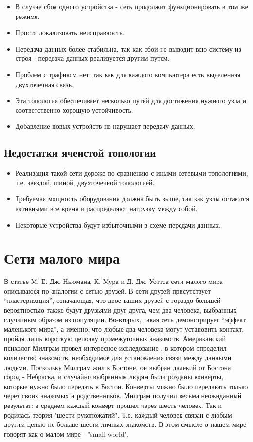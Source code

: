 \documentclass[a4paper]{article}
\begin{document}
\begin{itemize}
    \item В случае сбоя одного устройства - сеть продолжит функционировать в том же режиме.
    \item Просто локализовать неисправность.
    \item Передача данных более стабильна, так как сбои не выводит всю систему из строя - передача данных реализуется другим путем.
    \item Проблем с трафиком нет, так как для каждого компьютера есть выделенная двухточечная связь.
    \item Эта топология обеспечивает несколько путей для достижения нужного узла и соответственно хорошую устойчивость.
    \item Добавление новых устройств не нарушает передачу данных.
\end{itemize}

\subsection[]{Недостатки ячеистой топологии}
\begin{itemize}
    \item Реализация такой сети дороже по сравнению с иными сетевыми топологиями, т.е. звездой, шиной, двухточечной топологией.
    \item Требуемая мощность оборудования должна быть выше, так как узлы остаются активными все время и распределяют нагрузку между собой.
    \item Некоторые устройства будут избыточными в схеме передачи данных.
\end{itemize}

\section{Сети малого мира}
В статье  М. Е. Дж. Ньюмана, К. Мура и Д. Дж. Уоттса \cite{litlink4} сети малого мира описываюся по аналогии с сетью друзей. 
В сети друзей присутствует “кластеризация”, означающая, что двое ваших друзей с гораздо большей вероятностью также будут друзьями друг друга, чем два человека, выбранных случайным образом из популяции. 
Во-вторых, такая сеть демонстрирует “эффект маленького мира”, а именно, что любые два человека могут установить контакт, пройдя лишь короткую цепочку промежуточных знакомств. 
Американский психолог Милграм провел интересное исследование \cite{litlink5}, в котором определил количество знакомств, необходимое для установления связи между данными людьми. Поскольку Милграм жил в Бостоне, он выбран далекий от Бостона город - Небраска, 
и случайно выбранным людям были розданы конверты, которые нужно было передать в Бостон. Конверты можно было передавать только через своих знакомых и родственников. Милграм получил весьма неожиданный результат: 
в среднем каждый конверт прошел через шесть человек. Так и родилась теория "шести рукопожатий". Т.е. каждый человек связан с любым другим цепью не больше шести личных знакомств. В этом смысле о нашем мире говорят как о малом мире - "small world".
\end{document}

